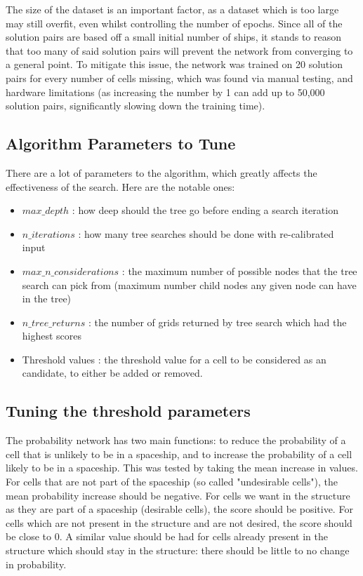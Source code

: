 \documentclass{l4proj}
\begin{document}
The size of the dataset is an important factor, as a dataset which is too large may still overfit, even whilst controlling the number of epochs. Since all of the solution pairs are based off a small initial number of ships, it stands to reason that too many of said solution pairs will prevent the network from converging to a general point. To mitigate this issue, the network was trained on 20 solution pairs for every number of cells missing, which was found via manual testing, and hardware limitations (as increasing the number by 1 can add up to 50,000 solution pairs, significantly slowing down the training time).

\subsection{Algorithm Parameters to Tune}

There are a lot of parameters to the algorithm, which greatly affects the effectiveness of the search. Here are the notable ones:
 
\begin{itemize}
    \item $max\_depth$ : how deep should the tree go before ending a search iteration
    \item $n\_iterations$ : how many tree searches should be done with re-calibrated input
    \item $max\_n\_considerations$ : the maximum number of possible nodes that the tree search can pick from (maximum number child nodes any given node can have in the tree)
    \item $n\_tree\_returns$ : the number of grids returned by tree search which had the highest scores
    \item Threshold values : the threshold value for a cell to be considered as an candidate, to either be added or removed.
\end{itemize} 

\subsection{Tuning the threshold parameters}

The probability network has two main functions: to reduce the probability of a cell that is unlikely to be in a spaceship, and to increase the probability of a cell likely to be in a spaceship. This was tested by taking the mean increase in values. For cells that are not part of the spaceship (so called "undesirable cells"), the mean probability increase should be negative. For cells we want in the structure as they are part of a spaceship (desirable cells), the score should be positive. For cells which are not present in the structure and are not desired, the score should be close to 0. A similar value should be had for cells already present in the structure which should stay in the structure: there should be little to no change in probability. 
\end{document}
